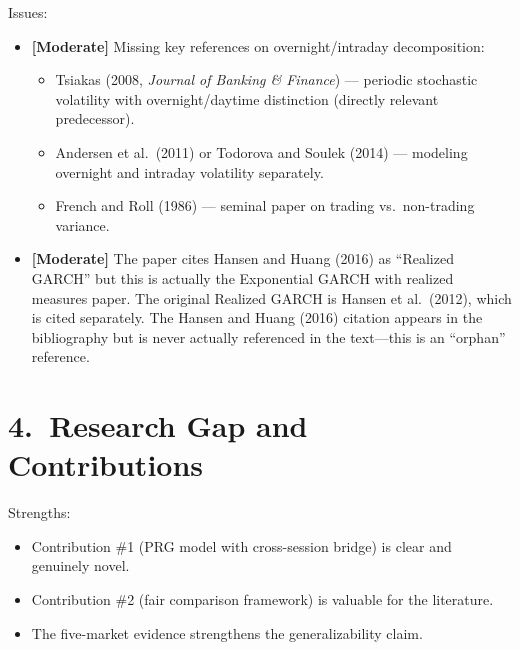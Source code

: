 \documentclass[12pt,a4paper]{article}
\begin{document}
\noindent \textcolor{warncolor}{Issues:}
\begin{itemize}[nosep]
\item [\textcolor{warncolor}{M4}] \textbf{[Moderate]} Missing key references on overnight/intraday decomposition:
  \begin{itemize}[nosep]
  \item Tsiakas (2008, \textit{Journal of Banking \& Finance}) --- periodic stochastic volatility with overnight/daytime distinction (directly relevant predecessor).
  \item Andersen et al.\ (2011) or Todorova and Soulek (2014) --- modeling overnight and intraday volatility separately.
  \item French and Roll (1986) --- seminal paper on trading vs.\ non-trading variance.
  \end{itemize}
\item [\textcolor{warncolor}{M5}] \textbf{[Moderate]} The paper cites Hansen and Huang (2016) as ``Realized GARCH'' but this is actually the Exponential GARCH with realized measures paper. The original Realized GARCH is Hansen et al.\ (2012), which is cited separately. The Hansen and Huang (2016) citation appears in the bibliography but is never actually referenced in the text---this is an ``orphan'' reference.
\end{itemize}

\bigskip

\section*{4.\ Research Gap and Contributions}

\noindent \textcolor{okgreen}{Strengths:}
\begin{itemize}[nosep]
\item Contribution \#1 (PRG model with cross-session bridge) is clear and genuinely novel.
\item Contribution \#2 (fair comparison framework) is valuable for the literature.
\item The five-market evidence strengthens the generalizability claim.
\end{itemize}
\end{document}
